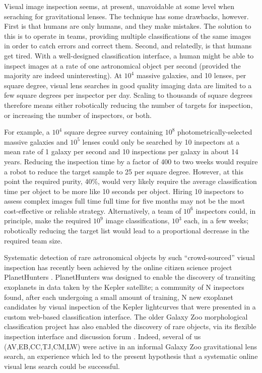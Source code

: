 \documentclass[useAMS,usenatbib,a4paper]{mn2e}
\begin{document}
Visual image inspection seems, at present, unavoidable at some level when
seraching for gravitational lenses. The technique has some drawbacks, however.
First is that humans are only humans, and they make mistakes. The solution to
this is to operate in teams, providing multiple classifications of the same
images in order to catch errors and correct them. Second, and relatedly, is
that humans get tired. With a well-designed classification interface, a human
might be able to inspect images at a rate of one astronomical object per
second (provided the majority are indeed uninteresting). At $10^4$ massive
galaxies, and 10 lenses, per square degree, visual lens searches in good
quality imaging data are limited to a few square degrees per inspector per
day. Scaling to thousands of square degrees therefore means either robotically
reducing the number of targets for inspection, or increasing the number of
inspectors, or both. 

For example, a $10^4$ square degree survey containing $10^8$
photometrically-selected massive galaxies and $10^5$ lenses could only be
searched by 10 inspectors at a mean rate of 1 galaxy per second and 10
inspections per galaxy in about 14 years. Reducing the inspection time by a
factor of 400 to two weeks would require a robot to reduce the target sample
to 25 per square degree. However, at this point the required purity, 40\%,
would very likely require the average classification time per object to be
more like 10 seconds per object. Hiring 10 inspectors to assess complex images
full time full time for five months may not be the most cost-effective or
reliable strategy. Alternatively, a team of $10^6$ inspectors could, in
principle, make the required $10^9$ image classifications, $10^3$ each, in a
few weeks; robotically reducing the target list would lead to a proportional
decrease in the required team size.

Systematic detection of rare astronomical objects by such ``crowd-sourced''
visual inspection has recently been achieved by the online citizen science
project PlanetHunters \citep{SchwambEtal2012}. PlanetHunters was designed to
enable the discovery of transiting exoplanets in data taken by the Kepler
satellite; a community of N inspectors found, after each undergoing a small
amount of training, N new exoplanet candidates by visual inspection of the
Kepler lightcurves that were presented in a custom web-based classification
interface. The older Galaxy Zoo morphological classification project
\citep{LintottEtal2008} has also enabled the discovery of rare objects, via its
flexible inspection interface and discussion forum \citep{LintottEtal2009}. Indeed, several of us
(AV,EB,CC,TJ,CM,LW) were active in an informal Galaxy Zoo gravitational lens
search, an experience which led to the present hypothesis that a systematic
online visual lens search could be successful. 
\end{document}
